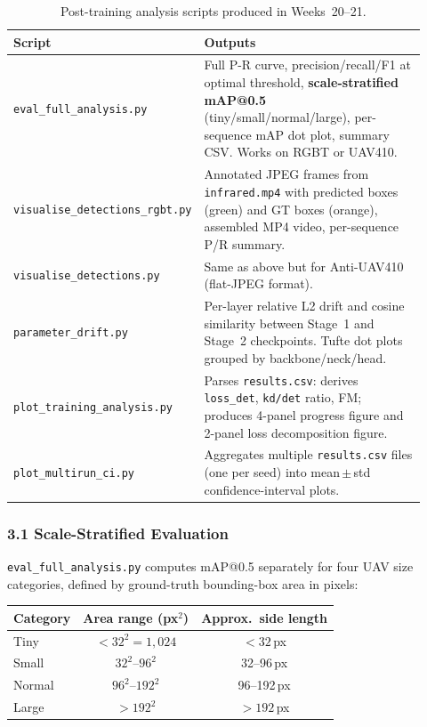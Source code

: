 \begin{table}[h]
\centering
\caption{Post-training analysis scripts produced in Weeks~20--21.}
\label{tab:analysis_scripts}
\small
\begin{tabular}{p{0.30\linewidth}p{0.62\linewidth}}
\hline
\textbf{Script} & \textbf{Outputs} \\
\hline
\texttt{eval\_full\_analysis.py}
  & Full P-R curve, precision/recall/F1 at optimal threshold,
    \textbf{scale-stratified mAP@0.5} (tiny/small/normal/large),
    per-sequence mAP dot plot, summary CSV. Works on RGBT or UAV410. \\[4pt]
\texttt{visualise\_detections\_rgbt.py}
  & Annotated JPEG frames from \texttt{infrared.mp4} with predicted
    boxes (green) and GT boxes (orange), assembled MP4 video,
    per-sequence P/R summary. \\[4pt]
\texttt{visualise\_detections.py}
  & Same as above but for Anti-UAV410 (flat-JPEG format). \\[4pt]
\texttt{parameter\_drift.py}
  & Per-layer relative L2 drift and cosine similarity between Stage~1
    and Stage~2 checkpoints. Tufte dot plots grouped by backbone/neck/head. \\[4pt]
\texttt{plot\_training\_analysis.py}
  & Parses \texttt{results.csv}: derives \texttt{loss\_det},
    \texttt{kd/det} ratio, FM; produces 4-panel progress figure
    and 2-panel loss decomposition figure. \\[4pt]
\texttt{plot\_multirun\_ci.py}
  & Aggregates multiple \texttt{results.csv} files (one per seed)
    into mean\,$\pm$\,std confidence-interval plots. \\
\hline
\end{tabular}
\end{table}

\subsubsection*{3.1 Scale-Stratified Evaluation}

\texttt{eval\_full\_analysis.py} computes mAP@0.5 separately
for four UAV size categories, defined by ground-truth bounding-box
area in pixels:

\begin{center}\small
\begin{tabular}{lcc}
\hline
\textbf{Category} & \textbf{Area range (px$^2$)} & \textbf{Approx.\ side length} \\
\hline
Tiny   & $< 32^2 = 1{,}024$        & $< 32$\,px \\
Small  & $32^2$--$96^2$             & 32--96\,px \\
Normal & $96^2$--$192^2$            & 96--192\,px \\
Large  & $> 192^2$                  & $> 192$\,px \\
\hline
\end{tabular}
\end{center}

